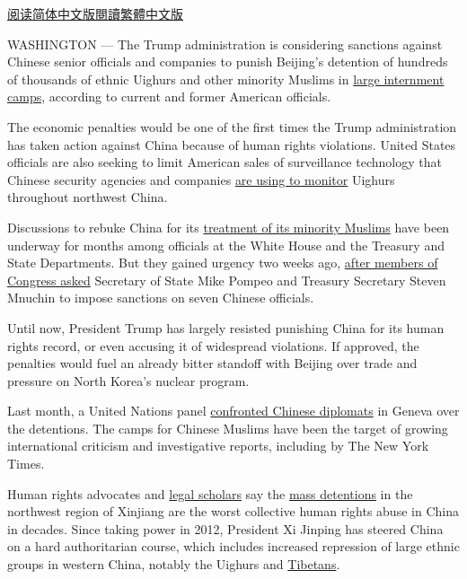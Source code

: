 \href{https://cn.nytimes.com/usa/20180911/us-china-sanctions-muslim-camps/}{阅读简体中文版}\href{https://cn.nytimes.com/usa/20180911/us-china-sanctions-muslim-camps/zh-hant/}{閱讀繁體中文版}

WASHINGTON --- The Trump administration is considering sanctions against
Chinese senior officials and companies to punish Beijing's detention of
hundreds of thousands of ethnic Uighurs and other minority Muslims in
\href{https://www.nytimes.com/2018/09/08/world/asia/china-uighur-muslim-detention-camp.html}{large
internment camps}, according to current and former American officials.

The economic penalties would be one of the first times the Trump
administration has taken action against China because of human rights
violations. United States officials are also seeking to limit American
sales of surveillance technology that Chinese security agencies and
companies
\href{https://www.buzzfeednews.com/article/meghara/the-police-state-of-the-future-is-already-here\#.nyemLvQxY}{are
using to monitor} Uighurs throughout northwest China.

Discussions to rebuke China for its
\href{https://www.academia.edu/37353916/NEW_Sept_2018_Thoroughly_Reforming_Them_Towards_a_Healthy_Heart_Attitude_-_Chinas_Political_Re-Education_Campaign_in_Xinjiang}{treatment
of its minority Muslims} have been underway for months among officials
at the White House and the Treasury and State Departments. But they
gained urgency two weeks ago,
\href{https://www.cecc.gov/media-center/press-releases/chairs-lead-bipartisan-letter-urging-administration-to-sanction-chinese}{after
members of Congress asked} Secretary of State Mike Pompeo and Treasury
Secretary Steven Mnuchin to impose sanctions on seven Chinese officials.

Until now, President Trump has largely resisted punishing China for its
human rights record, or even accusing it of widespread violations. If
approved, the penalties would fuel an already bitter standoff with
Beijing over trade and pressure on North Korea's nuclear program.

Last month, a United Nations panel
\href{https://www.nytimes.com/2018/08/10/world/asia/china-xinjiang-un-uighurs.html}{confronted
Chinese diplomats} in Geneva over the detentions. The camps for Chinese
Muslims have been the target of growing international criticism and
investigative reports, including by The New York Times.

Human rights advocates and
\href{http://www.jeromecohen.net/jerrys-blog/2018/7/25/what-can-be-done-regarding-xinjiangs-mass-detentions}{legal
scholars} say the
\href{https://www.nytimes.com/2018/08/10/world/asia/china-xinjiang-rahile-dawut.html}{mass
detentions} in the northwest region of Xinjiang are the worst collective
human rights abuse in China in decades. Since taking power in 2012,
President Xi Jinping has steered China on a hard authoritarian course,
which includes increased repression of large ethnic groups in western
China, notably the Uighurs and
\href{https://www.nytimes.com/2018/06/07/world/asia/china-tashi-wangchuk.html}{Tibetans}.

